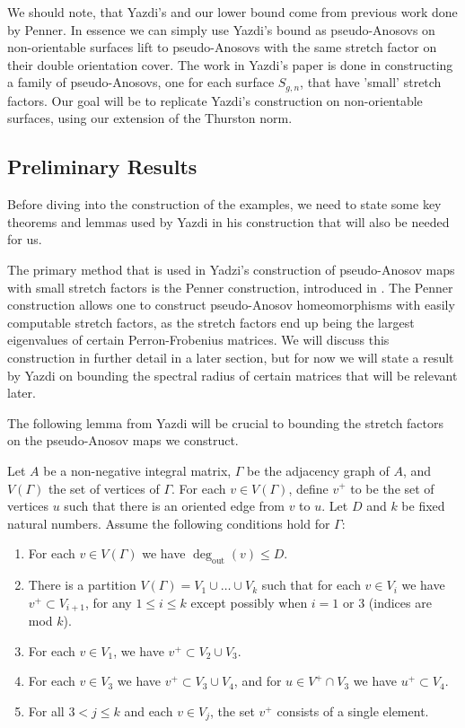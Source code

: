 We should note, that Yazdi's and our lower bound come from previous work done by Penner. In essence we can simply use Yazdi's bound as pseudo-Anosovs on non-orientable surfaces lift to pseudo-Anosovs with the same stretch factor on their double orientation cover. The work in Yazdi's paper is done in constructing a family of pseudo-Anosovs, one for each surface $S_{g,n}$, that have 'small' stretch factors. Our goal will be to replicate Yazdi's construction on non-orientable surfaces, using our extension of the Thurston norm.

\subsection{Preliminary Results}

Before diving into the construction of the examples, we need to state some key theorems and lemmas used by Yazdi in his construction that will also be needed for us.

The primary method that is used in Yadzi's construction of pseudo-Anosov maps with small stretch factors is the Penner construction, introduced in \cite{penner1988construction}. The Penner construction allows one to construct pseudo-Anosov homeomorphisms with easily computable stretch factors, as the stretch factors end up being the largest eigenvalues of certain Perron-Frobenius matrices. We will discuss this construction in further detail in a later section, but for now we will state a result by Yazdi on bounding the spectral radius of certain matrices that will be relevant later.

The following lemma from Yazdi will be crucial to bounding the stretch factors on the pseudo-Anosov maps we construct.

\begin{lem}[Yazdi]
Let $A$ be a non-negative integral matrix, $\Gamma$ be the adjacency graph of $A$, and $V(\Gamma)$ the set of vertices of $\Gamma$. For each $v \in V(\Gamma)$, define $v^+$ to be the set of vertices $u$ such that there is an oriented edge from $v$ to $u$. Let $D$ and $k$ be fixed natural numbers. Assume the following conditions hold for $\Gamma$: \begin{enumerate}
    \item For each $v \in V(\Gamma)$ we have $\deg_{\text{out}}(v) \leq D$.
    \item There is a partition $V(\Gamma) = V_1 \cup \dots \cup V_k$ such that for each $v \in V_i$ we have $v^+ \subset V_{i+1}$, for any $1 \leq i \leq k$ except possibly when $i = 1$ or 3 (indices are mod $k$).
    \item For each $v \in V_1$, we have $v^+ \subset V_2 \cup V_3$.
    \item For each $v \in V_3$ we have $v^+ \subset V_3 \cup V_4$, and for $u \in V^+ \cap V_3$ we have $u^+ \subset V_4$.
    \item For all $3 < j \leq k$ and each $v \in V_j$, the set $v^+$ consists of a single element.
\end{enumerate}
\end{lem}

